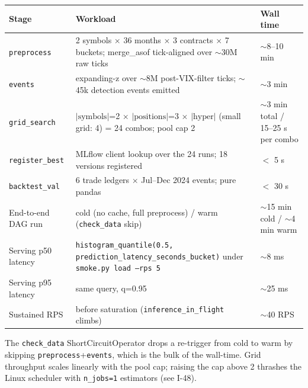 \documentclass[11pt,a4paper]{article}
\begin{document}
\begin{tabularx}{\linewidth}{@{}lXl@{}}
\toprule
\textbf{Stage} & \textbf{Workload} & \textbf{Wall time} \\
\midrule
\texttt{preprocess}             & 2 symbols $\times$ 36 months $\times$ 3 contracts $\times$ 7 buckets; merge\_asof tick-aligned over $\sim$30M raw ticks    & $\sim$8--10 min \\
\texttt{events}                 & expanding-z over $\sim$8M post-VIX-filter ticks; $\sim$45k detection events emitted                                       & $\sim$3 min \\
\texttt{grid\_search}           & $|\text{symbols}|$=2 $\times$ $|\text{positions}|$=3 $\times$ $|\text{hyper}|$ (small grid: 4) = 24 combos; pool cap 2     & $\sim$3 min total / 15--25 s per combo \\
\texttt{register\_best}         & MLflow client lookup over the 24 runs; 18 versions registered                                                             & $<$ 5 s \\
\texttt{backtest\_val}          & 6 trade ledgers $\times$ Jul--Dec 2024 events; pure pandas                                                                & $<$ 30 s \\
End-to-end DAG run              & cold (no cache, full preprocess) / warm (\texttt{check\_data} skip)                                                       & $\sim$15 min cold / $\sim$4 min warm \\
\midrule
Serving p50 latency             & \texttt{histogram\_quantile(0.5, prediction\_latency\_seconds\_bucket)} under \texttt{smoke.py load --rps 5}              & $\sim$8 ms \\
Serving p95 latency             & same query, q=0.95                                                                                                        & $\sim$25 ms \\
Sustained RPS                   & before saturation (\texttt{inference\_in\_flight} climbs)                                                                 & $\sim$40 RPS \\
\bottomrule
\end{tabularx}

The \texttt{check\_data} ShortCircuitOperator drops a re-trigger from cold to warm by skipping \texttt{preprocess}+\texttt{events}, which is the bulk of the wall-time. Grid throughput scales linearly with the pool cap; raising the cap above 2 thrashes the Linux scheduler with \texttt{n\_jobs=1} estimators (see I-48).
\end{document}
